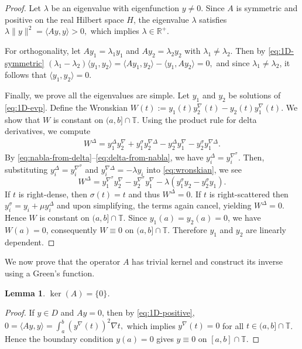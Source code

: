\documentclass{article}
\newtheorem{lemma}[theorem]{Lemma}
\numberwithin{equation}{section}
\numberwithin{theorem}{section}
\newcommand{\shalmalirmk}[1]{\textcolor{red}{\textsf{[Shalmali: #1]}}}
\begin{document}
\begin{proof}
Let $\lambda$ be an eigenvalue with eigenfunction $y \neq 0$. Since $A$ is symmetric and positive on the real Hilbert space $H$, the eigenvalue $\lambda$ satisfies
$\lambda \|y\|^2 = \langle Ay, y \rangle > 0,$
which implies $\lambda \in \mathbb{R}^+$.

For orthogonality, let $Ay_1 = \lambda_1 y_1$ and $Ay_2 = \lambda_2 y_2$ with $\lambda_1 \neq \lambda_2$. Then by \eqref{eq:1D-symmetric}
$(\lambda_1 - \lambda_2) \langle y_1, y_2 \rangle = \langle Ay_1, y_2 \rangle - \langle y_1, Ay_2 \rangle = 0,$
and since $\lambda_1 \neq \lambda_2$, it follows that $\langle y_1, y_2 \rangle = 0$.

Finally, we prove all the eigenvalues are simple. Let $y_1$ and $y_2$ be solutions of \eqref{eq:1D-evp}. Define the Wronskian
$W(t) := y_1(t) y_2^{\nabla}(t) - y_2(t) y_1^{\nabla}(t).$
We show that $W$ is constant on $(a,b]\cap\mathbb{T}$. Using the product rule for delta derivatives, we compute
\begin{align}
\label{eq:wronskian}
W^\Delta = y_1^\Delta y_2^\nabla + y_1^\sigma y_2^{\nabla\Delta} - y_2^\Delta y_1^\nabla - y_2^\sigma y_1^{\nabla\Delta}.
\end{align}
By \eqref{eq:nabla-from-delta}--\eqref{eq:delta-from-nabla}, we have $y_i^\Delta = y_i^{\nabla^ \sigma}$. Then, substituting $y_i^\Delta = y_i^{\nabla^ \sigma}$ and $y_i^{\nabla\Delta} = -\lambda y_i$ into \eqref{eq:wronskian}, we see
\[
W^\Delta = y_1^{\nabla^ \sigma} y_2^\nabla - y_2^{\nabla^ \sigma} y_1^\nabla - \lambda(y_1^\sigma y_2 - y_2^\sigma y_1).
\]
If $t$ is right-dense, then $\sigma(t) = t$ and thus $W^\Delta =0$.
If $t$ is right-scattered then $y_i^\sigma = y_i + \mu y_i^\Delta$ and upon simplifying, the terms again cancel, yielding $W^\Delta = 0$.
Hence $W$ is constant on $(a,b]\cap\mathbb{T}$. Since $y_1(a) = y_2(a) = 0$, we have $W(a) = 0$, consequently $W \equiv 0$ on $(a,b]\cap\mathbb{T}$. Therefore $y_1$ and $y_2$ are linearly dependent.
\end{proof}
We now prove that the operator $A$ has trivial kernel and construct its inverse using a Green's function.

\begin{lemma}\label{lem:ker-A}
$\ker(A) = \{0\}$.
\end{lemma}

\begin{proof}
If $y \in D$ and $Ay = 0$, then by \eqref{eq:1D-positive}, $0 = \langle Ay, y \rangle = \displaystyle\int_a^b \left( y^\nabla(t) \right)^2 \nabla t,$
which implies $y^\nabla(t) = 0$ for all $t \in (a,b]\cap\mathbb{T}$. Hence the boundary condition $y(a) = 0$ gives $y \equiv 0$ on $[a,b]\cap\mathbb{T}$.
\end{proof}
\end{document}
